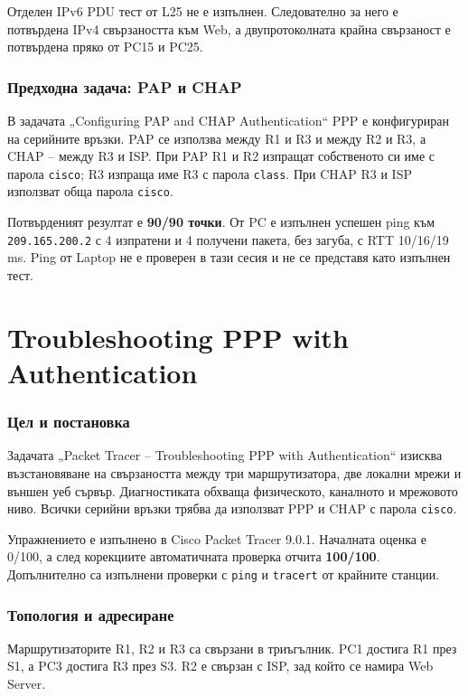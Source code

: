 \documentclass[12pt]{article}
\begin{document}
Отделен IPv6 PDU тест от L25 не е изпълнен. Следователно за него е потвърдена IPv4 свързаността към Web, а двупротоколната крайна свързаност е потвърдена пряко от PC15 и PC25.

\section{Предходна задача: PAP и CHAP}
В задачата „Configuring PAP and CHAP Authentication“ PPP е конфигуриран на серийните връзки. PAP се използва между R1 и R3 и между R2 и R3, а CHAP -- между R3 и ISP. При PAP R1 и R2 изпращат собственото си име с парола \texttt{cisco}; R3 изпраща име R3 с парола \texttt{class}. При CHAP R3 и ISP използват обща парола \texttt{cisco}.

Потвърденият резултат е \textbf{90/90 точки}. От PC е изпълнен успешен ping към \texttt{209.165.200.2} с 4 изпратени и 4 получени пакета, без загуба, с RTT 10/16/19 ms. Ping от Laptop не е проверен в тази сесия и не се представя като изпълнен тест.


\clearpage
\part{Troubleshooting PPP with Authentication}
\section{Цел и постановка}
Задачата „Packet Tracer -- Troubleshooting PPP with Authentication“ изисква възстановяване на свързаността между три маршрутизатора, две локални мрежи и външен уеб сървър. Диагностиката обхваща физическото, каналното и мрежовото ниво. Всички серийни връзки трябва да използват PPP и CHAP с парола \texttt{cisco}.

Упражнението е изпълнено в Cisco Packet Tracer 9.0.1. Началната оценка е 0/100, а след корекциите автоматичната проверка отчита \textbf{100/100}. Допълнително са изпълнени проверки с \texttt{ping} и \texttt{tracert} от крайните станции.

\section{Топология и адресиране}
Маршрутизаторите R1, R2 и R3 са свързани в триъгълник. PC1 достига R1 през S1, а PC3 достига R3 през S3. R2 е свързан с ISP, зад който се намира Web Server.
\end{document}

